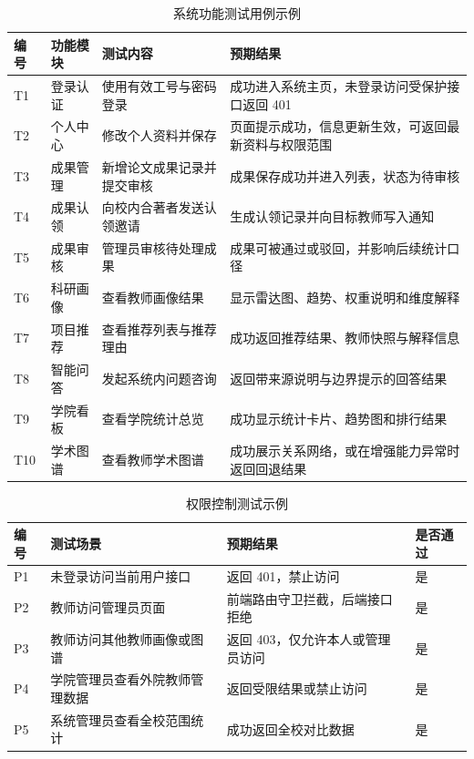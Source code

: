 \documentclass[12pt,a4paper]{ctexbook}
\begin{document}
\begin{table}[H]
  \centering
  \small
  \caption{系统功能测试用例示例}
  \label{tab:function-test}
  \begin{tabular}{p{1.3cm}p{2.6cm}p{4.4cm}p{3.1cm}}
    \toprule
    编号 & 功能模块 & 测试内容 & 预期结果 \\
    \midrule
    T1 & 登录认证 & 使用有效工号与密码登录 & 成功进入系统主页，未登录访问受保护接口返回 401 \\
    T2 & 个人中心 & 修改个人资料并保存 & 页面提示成功，信息更新生效，可返回最新资料与权限范围 \\
    T3 & 成果管理 & 新增论文成果记录并提交审核 & 成果保存成功并进入列表，状态为待审核 \\
    T4 & 成果认领 & 向校内合著者发送认领邀请 & 生成认领记录并向目标教师写入通知 \\
    T5 & 成果审核 & 管理员审核待处理成果 & 成果可被通过或驳回，并影响后续统计口径 \\
    T6 & 科研画像 & 查看教师画像结果 & 显示雷达图、趋势、权重说明和维度解释 \\
    T7 & 项目推荐 & 查看推荐列表与推荐理由 & 成功返回推荐结果、教师快照与解释信息 \\
    T8 & 智能问答 & 发起系统内问题咨询 & 返回带来源说明与边界提示的回答结果 \\
    T9 & 学院看板 & 查看学院统计总览 & 成功显示统计卡片、趋势图和排行结果 \\
    T10 & 学术图谱 & 查看教师学术图谱 & 成功展示关系网络，或在增强能力异常时返回回退结果 \\
    \bottomrule
  \end{tabular}
\end{table}

\begin{table}[H]
  \centering
  \small
  \caption{权限控制测试示例}
  \label{tab:permission-test}
  \begin{tabular}{p{1.5cm}p{3.3cm}p{4.5cm}p{2.2cm}}
    \toprule
    编号 & 测试场景 & 预期结果 & 是否通过 \\
    \midrule
    P1 & 未登录访问当前用户接口 & 返回 401，禁止访问 & 是 \\
    P2 & 教师访问管理员页面 & 前端路由守卫拦截，后端接口拒绝 & 是 \\
    P3 & 教师访问其他教师画像或图谱 & 返回 403，仅允许本人或管理员访问 & 是 \\
    P4 & 学院管理员查看外院教师管理数据 & 返回受限结果或禁止访问 & 是 \\
    P5 & 系统管理员查看全校范围统计 & 成功返回全校对比数据 & 是 \\
    \bottomrule
  \end{tabular}
\end{table}
\end{document}
